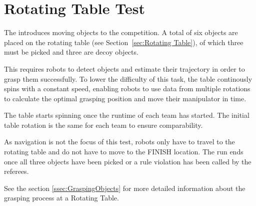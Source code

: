 \section{Rotating Table Test}
\label{sec:Rotating Table Test}

The  introduces moving objects to the competition.
A total of six objects are placed on the rotating table (see Section~\ref{sec:Rotating Table}), of which three must be picked and three are decoy objects.

This requires robots to detect objects and estimate their trajectory in order to grasp them successfully.
To lower the difficulty of this task, the table continously spins with a constant speed, enabling robots to use data from multiple rotations to calculate the optimal grasping position and move their manipulator in time.

%

The table starts spinning once the runtime of each team has started.
The initial table rotation is the same for each team to ensure comparability.  

As navigation is not the focus of this test, robots only have to travel to the rotating table and do not have to move to the FINISH location. The run ends once all three objects have been picked or a rule violation has been called by the referees.

See the section \ref{ssec:GraspingObjects} for more detailed information about the grasping process at a Rotating Table.

